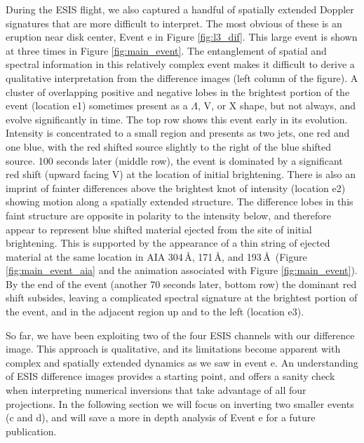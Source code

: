     	During the ESIS flight, we also captured a handful of spatially extended Doppler signatures that are more difficult to interpret.
    	The most obvious of these is an eruption near disk center, Event e in Figure \ref{fig:l3_dif}.
    	This large event is shown at three times in Figure \ref{fig:main_event}.
    	The entanglement of spatial and spectral information in this relatively complex event makes it difficult to derive a qualitative interpretation from the difference images (left column of the figure).
    	A cluster of overlapping positive and negative lobes in the brightest portion of the event (location e1) sometimes present as a $\Lambda$, V, or X shape, but not always, and evolve significantly in time.
    	The top row shows this event early in its evolution. 
    	Intensity is concentrated to a small region and presents as two jets, one red and one blue, with the red shifted source slightly to the right of the blue shifted source. 
    	100 seconds later (middle row), the event is dominated by a significant red shift (upward facing V) at the location of initial brightening. 
    	There is also an imprint of fainter differences above the brightest knot of intensity (location e2) showing motion along a spatially extended structure.
    	The difference lobes in this faint structure are opposite in polarity to the intensity below, and therefore appear to represent  blue shifted material ejected from the site of initial brightening.
    	This is supported by the appearance of a thin string of ejected material at the same location in AIA 304\,\AA, 171\,\AA, and 193\,\AA \ (Figure \ref{fig:main_event_aia} and the animation associated with Figure \ref{fig:main_event}).
    	By the end of the event (another 70 seconds later, bottom row) the dominant red shift subsides, leaving a complicated spectral signature at the brightest portion of the event, and in the adjacent region up and to the left (location e3).  
    	
    	So far, we have been exploiting two of the four ESIS channels with our difference image. This approach is qualitative,
    	and its limitations become apparent with complex and spatially extended dynamics as we saw in event e.
    	An understanding of ESIS difference images provides a starting point,
    	and offers a sanity check when interpreting numerical inversions that take advantage of all four projections.
    	In the following section we will focus on inverting two smaller events (c and d), and will save a more in depth analysis of Event e for a future publication. 
    	
